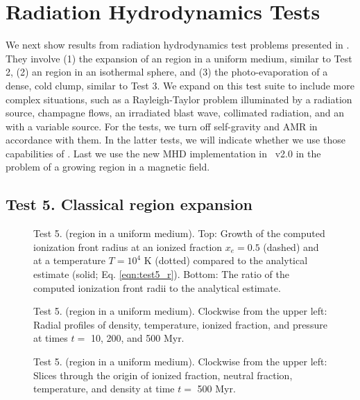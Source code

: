 \documentclass[useAMS,usenatbib]{mn2e}
\begin{document}
\section{Radiation Hydrodynamics Tests}
\label{sec:radhydro}

We next show results from radiation hydrodynamics test problems
presented in \citet[][hereafter RT09]{Iliev09}.  They involve (1) the
expansion of an \hii region in a uniform medium, similar to Test
2, (2) an \hii region in an isothermal sphere, and (3) the
photo-evaporation of a dense, cold clump, similar to Test 3.  We
expand on this test suite to include more complex situations, such as
a Rayleigh-Taylor problem illuminated by a radiation source, champagne
flows, an irradiated blast wave, collimated radiation, and an
\hii with a variable source.  For the \citeauthor{Iliev09}
tests, we turn off self-gravity and AMR in accordance with them.  In
the latter tests, we will indicate whether we use those capabilities
of \enzo.  Last we use the new MHD implementation in \enzo~v2.0 in the
problem of a growing \hii region in a magnetic field.

\subsection{Test 5. Classical \hii region expansion}
\label{sec:test5}

\begin{figure}
  \caption{\label{fig:test5_1} Test 5. (\hii region in a uniform
    medium).  Top: Growth of the computed ionization front radius at
    an ionized fraction $x_e = 0.5$ (dashed) and at a temperature $T =
    10^4$ K (dotted) compared to the analytical estimate (solid;
    Eq. \ref{eqn:test5_r}).  Bottom: The ratio of the computed
    ionization front radii to the analytical estimate.} 
\end{figure}

\begin{figure}
  \caption{\label{fig:test5_2} Test 5. (\hii region in a uniform
    medium).  Clockwise from the upper left: Radial profiles of
    density, temperature, ionized fraction, and pressure at times $t
    =$ 10, 200, and 500 Myr.}
\end{figure}

\begin{figure*}
  \caption{\label{fig:test5_3} Test 5. (\hii region in a uniform
    medium).  Clockwise from the upper left: Slices through the origin
    of ionized fraction, neutral fraction, temperature, and density at
    time $t =$ 500 Myr.}
\end{figure*}
\end{document}
